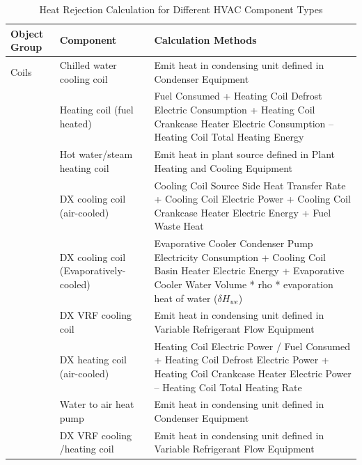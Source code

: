 \begin{longtable}[c]{p{1.0in}p{2.0in}p{3in}}
\caption{Heat Rejection Calculation for Different HVAC Component Types \label{table:emission-from-hvac-components}} \tabularnewline
\toprule 
Object Group & Component & Calculation Methods \tabularnewline
\midrule
\endhead
Coils      & Chilled water cooling coil   & Emit heat in condensing unit defined in Condenser Equipment \tabularnewline
           & Heating coil (fuel heated)   & Fuel Consumed + Heating Coil Defrost Electric Consumption + Heating Coil Crankcase Heater Electric Consumption – Heating Coil Total Heating Energy \tabularnewline
           & Hot water/steam heating coil & Emit heat in plant source defined in Plant Heating and Cooling Equipment \tabularnewline
           & DX cooling coil (air-cooled) & Cooling Coil Source Side Heat Transfer Rate + Cooling Coil Electric Power + Cooling Coil Crankcase Heater Electric Energy + Fuel Waste Heat \tabularnewline
           & DX cooling coil (Evaporatively-cooled)  & Evaporative Cooler Condenser Pump Electricity Consumption + Cooling Coil Basin Heater Electric Energy + Evaporative Cooler Water Volume * rho * evaporation heat of water (\(\delta H_{we}\)) \tabularnewline
           & DX VRF cooling coil          & Emit heat in condensing unit defined in Variable Refrigerant Flow Equipment \tabularnewline
           & DX heating coil (air-cooled) & Heating Coil Electric Power / Fuel Consumed + Heating Coil Defrost Electric Power + Heating Coil Crankcase Heater Electric Power – Heating Coil Total Heating Rate \tabularnewline
           & Water to air heat pump       & Emit heat in condensing unit defined in Condenser Equipment \tabularnewline
           & DX VRF cooling /heating coil & Emit heat in condensing unit defined in Variable Refrigerant Flow Equipment \tabularnewline


\end{longtable}
